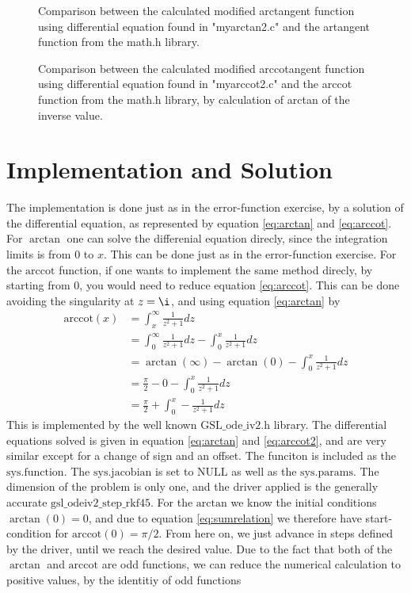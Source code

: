 \documentclass[twocolumn]{article}
\begin{document}
\begin{figure}

\caption{Comparison between the calculated modified arctangent function using differential equation found in "myarctan2.c" and the artangent function from the math.h library.}
\label{fig-atan2}
\end{figure}

\begin{figure}

\caption{Comparison between the calculated modified arccotangent function using differential equation found in "myarccot2.c" and the arccot function from the math.h library, by calculation of arctan of the inverse value.}
\label{fig-acot2}
\end{figure}

\section{Implementation and Solution}
The implementation is done just as in the error-function exercise, by a solution of the differential equation, as represented by equation \eqref{eq:arctan} and \eqref{eq:arccot}. For $\arctan$ one can solve the differenial equation direcly, since the integration limits is from $0$ to $x$. This can be done just as in the error-function exercise. For the $\mathrm{arccot}$ function, if one wants to implement the same method direcly, by starting from $0$, you would need to reduce equation \eqref{eq:arccot}. This can be done avoiding the singularity at $z=\i$, and using equation \eqref{eq:arctan} by
\begin{align}
\mathrm{arccot}(x) &= \int_x^\infty \frac{1}{z^2 + 1} dz \nonumber\\
&= \int_0^\infty \frac{1}{z^2 + 1} dz - \int_0^x \frac{1}{z^2 + 1} dz \nonumber \\
&= \arctan(\infty) - \arctan(0) - \int_0^x \frac{1}{z^2 + 1} dz \nonumber \\
&=  \frac{\pi}{2} - 0 - \int_0^x \frac{1}{z^2 + 1} dz \nonumber \\
&=  \frac{\pi}{2} + \int_0^x - \frac{1}{z^2 + 1} dz \label{eq:arccot2} 
\end{align}
This is implemented by the well known $\mathrm{GSL\_ ode\_ iv2.h}$ library. The differential equations solved is given in equation \eqref{eq:arctan} and \eqref{eq:arccot2}, and are very similar except for a change of sign and an offset. The funciton is included as the $\mathrm{sys.function}$. The $\mathrm{sys.jacobian}$ is set to $\mathrm{NULL}$ as well as the $\mathrm{sys.params}$. The dimension of the problem is only one, and the driver applied is the generally accurate $\mathrm{gsl\_odeiv2\_step\_rkf45}$. For the $\mathrm{arctan}$ we know the initial conditions $\arctan(0) = 0$, and due to equation \eqref{eq:sumrelation} we therefore have start-condition for $\mathrm{arccot}(0)=\pi /2$. From here on, we just advance in steps defined by the driver, until we reach the desired value. Due to the fact that both of the $\arctan$ and $\mathrm{arccot}$ are odd functions, we can reduce the numerical calculation to positive values, by the identitiy of odd functions
\end{document}
